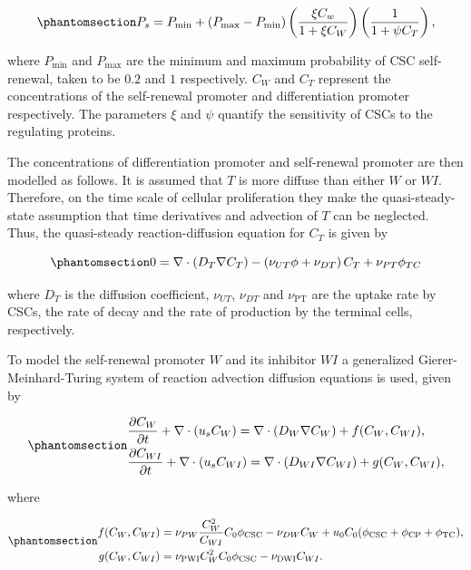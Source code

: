 \documentclass[
  letterpaper,
]{scrreprt}
\theoremstyle{definition}
\theoremstyle{remark}
\begin{document}
\begin{equation}\phantomsection\label{eq-youssefpour-Ps}{
P_s = P_\text{min} + (P_\text{max} - P_\text{min}) \left( \frac{\xi C_w}{1 + \xi C_W} \right)\left( \frac{1}{1 + \psi C_T} \right),
}\end{equation}

where \(P_\text{min}\) and \(P_\text{max}\) are the minimum and maximum
probability of CSC self-renewal, taken to be \(0.2\) and \(1\)
respectively. \(C_W\) and \(C_T\) represent the concentrations of the
self-renewal promoter and differentiation promoter respectively. The
parameters \(\xi\) and \(\psi\) quantify the sensitivity of CSCs to the
regulating proteins.

The concentrations of differentiation promoter and self-renewal promoter
are then modelled as follows. It is assumed that \(T\) is more diffuse
than either \(W\) or \(WI\). Therefore, on the time scale of cellular
proliferation they make the quasi-steady-state assumption that time
derivatives and advection of \(T\) can be neglected. Thus, the
quasi-steady reaction-diffusion equation for \(C_T\) is given by

\begin{equation}\phantomsection\label{eq-youssefpour-T}{
0 = \nabla \cdot (D_T \nabla C_T) - \left( \nu_{UT} \phi + \nu_{DT} \right) C_T + \nu_{PT}\phi_{TC}
}\end{equation}

where \(D_T\) is the diffusion coefficient, \(\nu_{UT}\), \(\nu_{DT}\)
and \(\nu_\text{PT}\) are the uptake rate by CSCs, the rate of decay and
the rate of production by the terminal cells, respectively.

To model the self-renewal promoter \(W\) and its inhibitor \(WI\) a
generalized Gierer-Meinhard-Turing system of reaction advection
diffusion equations is used, given by

\begin{equation}\phantomsection\label{eq-youssefpour-W-WI}{
\begin{aligned}
&\frac{\partial C_W}{\partial t} + \nabla \cdot (u_s C_W) = \nabla \cdot (D_W \nabla C_W) + f(C_W, C_{WI}), \\
&\frac{\partial C_{WI}}{\partial t} + \nabla \cdot (u_s C_{WI}) = \nabla \cdot (D_{WI} \nabla C_{WI}) + g(C_W, C_{WI}),
\end{aligned}
}\end{equation}

where

\begin{equation}\phantomsection\label{eq-youssefpour-f-g}{
\begin{aligned}
f(C_W, C_{WI}) &= \nu_{PW} \frac{C^2_W}{C_{WI}}C_0 \phi_\text{CSC} - \nu_{DW} C_W + u_0C_0 (\phi_\text{CSC} + \phi_\text{CP} + \phi_\text{TC}), \\
g(C_W, C_{WI}) &= \nu_\text{PWI}C^2_W C_0 \phi_\text{CSC} - \nu_\text{DWI} C_{WI}.
\end{aligned}
}\end{equation}
\end{document}

